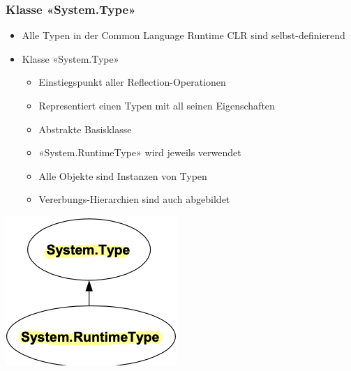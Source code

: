 \subsubsection{Klasse «System.Type»}
\begin{itemize}
    \item Alle Typen in der Common Language Runtime CLR sind selbst-definierend
    \item Klasse «System.Type»
    \begin{itemize}
        \item Einstiegspunkt aller Reflection-Operationen
        \item Representiert einen Typen mit all seinen Eigenschaften
        \item Abstrakte Basisklasse
        \item «System.RuntimeType» wird jeweils verwendet
        \item Alle Objekte sind Instanzen von Typen
        \item Vererbungs-Hierarchien sind auch abgebildet
    \end{itemize}
\end{itemize}
\vspace{-8pt}
\begin{center}
    \includegraphics[scale=.38]{graphic/ref attr/System.Type.png}
\end{center}
\vspace{-8pt}

